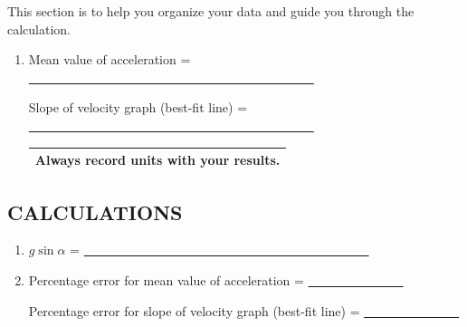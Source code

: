 This section is to help you organize your data and guide you through the calculation.

\begin{enumerate}[label=\arabic*.]

\item Mean value of acceleration = \ul{~~~~~~~~~~~~~~~~~~~~~~~~~~~~~~~~~~~~~~~~~~~~~}

Slope of velocity graph (best-fit line) = \ul{~~~~~~~~~~~~~~~~~~~~~~~~~~~~~~~~~~~~~~~~~~~~~}


\begin{center}
\begin{tabular}{|p{14cm}|}
\hline\tstrut
Always record units with your results.  \bstrut\\
\hline
\end{tabular}
\end{center}

\end{enumerate}

\subsection*{CALCULATIONS}

\begin{enumerate}[start=2]

\item \(g\sin\alpha\) = \ul{~~~~~~~~~~~~~~~~~~~~~~~~~~~~~~~~~~~~~~~~~~~~~}

\item  Percentage error for mean value of acceleration = \ul{~~~~~~~~~~~~~~~}

Percentage error for slope of velocity graph (best-fit line) = \ul{~~~~~~~~~~~~~~~}


\end{enumerate}

